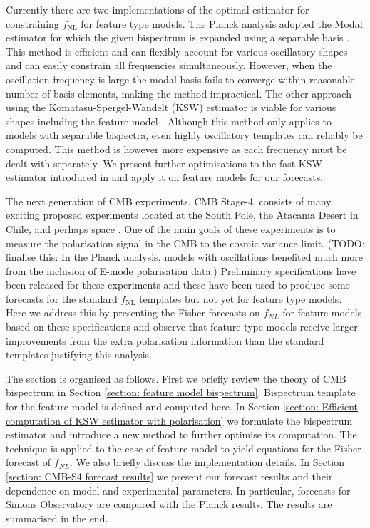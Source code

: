 Currently there are two implementations of the optimal estimator for constraining $f_\text{NL}$ for feature type models. The Planck analysis adopted the Modal estimator for which the given bispectrum is expanded using a separable basis \cite{Fergusson2012,Fergusson2014}. This method is efficient and can flexibly account for various oscillatory shapes and can easily constrain all frequencies simultaneously. However, when the oscillation frequency is large the modal basis fails to converge within reasonable number of basis elements, making the method impractical. The other approach using the Komatasu-Spergel-Wandelt (KSW) estimator is viable for various shapes including the feature model \cite{Komatsu2005,Munchmeyer2014}. Although this method only applies to models with separable bispectra, even highly oscillatory templates can reliably be computed.  This method is however more expensive as each frequency must be dealt with separately. We present further optimisations to the fast KSW estimator introduced in \cite{Yadav2007} and apply it on feature models for our forecasts.

The next generation of CMB experiments, CMB Stage-4, consists of many exciting proposed experiments located at the South Pole, the Atacama Desert in Chile, and perhaps space \cite{Abazajian2016,TheSimonsObservatoryCollaboration2018,TheCOrEcollaboration2015}. One of the main goals of these experiments is to measure the polarisation signal in the CMB to the cosmic variance limit. (TODO: finalise this: In the Planck analysis, models with oscillations benefited much more from the inclusion of E-mode polarisation data.) Preliminary specifications have been released for these experiments \cite{Abazajian2016,TheSimonsObservatoryCollaboration2018} and these have been used to produce some forecasts for the standard $f_\text{NL}$ templates but not yet for feature type models. Here we address this by presenting the Fisher forecasts on $f_{NL}$ for feature models based on these specifications and observe that feature type models receive larger improvements from the extra polarisation information than the standard templates justifying this analysis.

The section is organised as follows. First we briefly review the theory of CMB bispectrum in Section \ref{section: feature model bispectrum}. Bispectrum template for the feature model is defined and computed here. In Section \ref{section: Efficient computation of KSW estimator with polarisation} we formulate the bispectrum estimator and introduce a new method to further optimise its computation. The technique is applied to the case of feature model to yield equations for the Fisher forecast of $f_{NL}$. We also briefly discuss the implementation details. In Section \ref{section: CMB-S4 forecast results} we present our forecast results and their dependence on model and experimental parameters. In particular, forecasts for Simons Observatory are compared with the Planck results. The results are summarised in the end.


